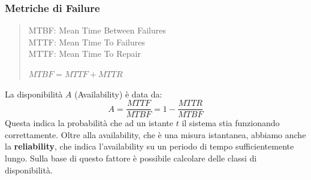 \documentclass{article}
\begin{document}
		\subsubsection{Metriche di Failure}\label{metriche-di-failure}
		\begin{quote}
			MTBF: Mean Time Between Failures \\
			MTTF: Mean Time To Failures \\
			MTTF: Mean Time To Repair
			
			\(MTBF = MTTF + MTTR\)
		\end{quote}
		
		La disponibilità \(A\) (Availability) è data da: \[
		A = \frac{MTTF}{MTBF} = 1 - \frac{MTTR}{MTBF}
		\] 
		Questa indica la probabilità che ad un istante $t$ il sistema stia funzionando correttamente. Oltre alla availability, che è una misura istantanea, abbiamo anche la \textbf{reliability}, che indica l'availability su un periodo di tempo sufficientemente lungo. Sulla base di questo fattore è possibile calcolare delle classi di disponibilità.\\
		
\end{document}
